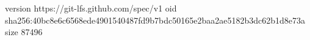 version https://git-lfs.github.com/spec/v1
oid sha256:40bc8e6c6568ede4901540487fd9b7bdc50165e2baa2ae5182b3dc62b1d8e73a
size 87496
